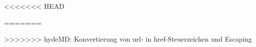 \documentclass[BCOR12mm,DIV11,titlepage,a4paper,oneside,10pt]{scrbook}
\begin{document}


\tableofcontents

\mainmatter




<<<<<<< HEAD
\begin{sloppypar}
\begin{flushleft}
=======

\newpage

>>>>>>> hydeMD: Konvertierung von url- in href-Steuerzeichen und Escaping
\listoffootnotes
\end{flushleft}
\end{sloppypar}


\newpage

\listofattachments
\end{document}
